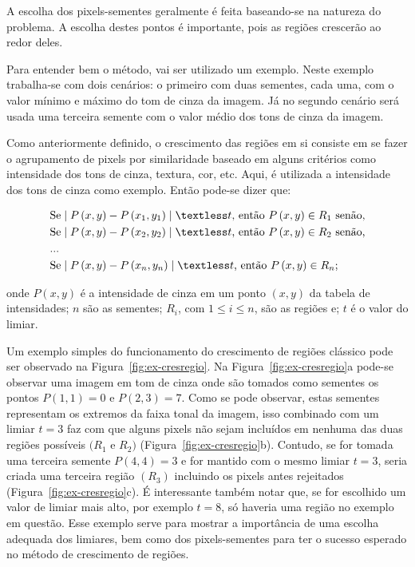 A escolha dos pixels-sementes geralmente é feita baseando-se na
natureza do problema. A escolha destes pontos é importante, pois as
regiões crescerão ao redor deles.

Para entender bem o método, vai ser utilizado um exemplo. Neste
exemplo trabalha-se com dois cenários: o primeiro com duas sementes,
cada uma, com o valor mínimo e máximo do tom de cinza da imagem. Já no
segundo cenário será usada uma terceira semente com o valor médio dos
tons de cinza da imagem.

Como anteriormente definido, o crescimento das regiões em si consiste
em se fazer o agrupamento de pixels por similaridade baseado em alguns
critérios como intensidade dos tons de cinza, textura, cor, etc. Aqui,
é utilizada a intensidade dos tons de cinza como exemplo. Então
pode-se dizer que:

\begin{align}
  &\text{Se}\mid P\left(x,y\right)-P\left(x_{1},y_{1}\right)\mid \textless t\text{, então $P\left(x,y\right)\in R_{1}$ senão,}\\
  &\text{Se}\mid P\left(x,y\right)-P\left(x_{2},y_{2}\right)\mid \textless t\text{, então $P\left(x,y\right)\in R_{2}$ senão,}\\
  &... \nonumber\\
  &\text{Se}\mid P\left(x,y\right)-P\left(x_{n},y_{n}\right)\mid
  \textless t\text{, então $P\left(x,y\right)\in
    R_{n}$;}
\end{align}

onde $P(x,y)$ é a intensidade de cinza em um ponto $(x,y)$ da tabela
de intensidades; $n$ são as sementes; $R_{i}$, com $1 \leqslant i
\leqslant n$, são as regiões e; $t$ é o valor do limiar.

Um exemplo simples do funcionamento do crescimento de regiões clássico
pode ser observado na Figura~\ref{fig:ex-cresregio}. Na
Figura~\ref{fig:ex-cresregio}a pode-se observar uma imagem em tom de
cinza onde são tomados como sementes os pontos $P(1,1) = 0$ e $P(2,3)
= 7$. Como se pode observar, estas sementes representam os extremos da
faixa tonal da imagem, isso combinado com um limiar $t = 3$ faz com
que alguns pixels não sejam incluídos em nenhuma das duas regiões
possíveis $(R_{1}$ e $R_{2})$
(Figura~\ref{fig:ex-cresregio}b). Contudo, se for tomada uma terceira
semente $P(4,4) = 3$ e for mantido com o mesmo limiar $t = 3$, seria
criada uma terceira região $(R_{3})$ incluindo os pixels antes
rejeitados (Figura~\ref{fig:ex-cresregio}c). É interessante também
notar que, se for escolhido um valor de limiar mais alto, por exemplo
$t = 8$, só haveria uma região no exemplo em questão. Esse exemplo
serve para mostrar a importância de uma escolha adequada dos limiares,
bem como dos pixels-sementes para ter o sucesso esperado no método de
crescimento de regiões.

